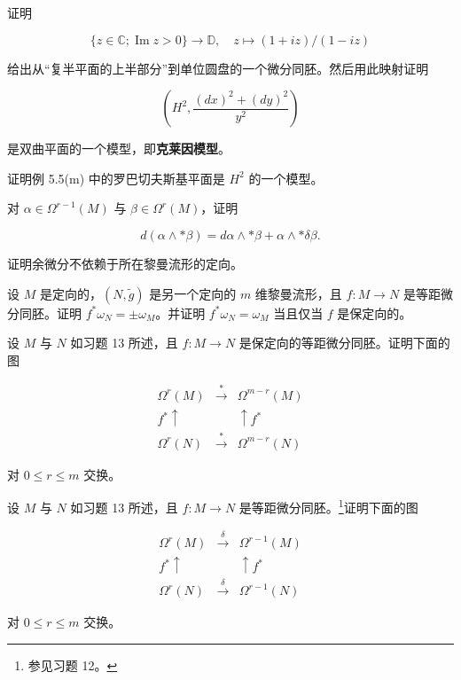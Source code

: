 \begin{exercises}
证明

\[
\{ z \in \mathbb{C} ; \operatorname{Im} z > 0 \} \to \mathbb{D} , \quad z \mapsto (1 + iz)/(1 - iz)
\]

给出从“复半平面的上半部分”到单位圆盘的一个微分同胚。然后用此映射证明

\[
\left( H^{2}, \frac{(dx)^{2} + (dy)^{2}}{y^{2}} \right)
\]

是双曲平面的一个模型，即\textbf{克莱因模型}。

\item

证明例 5.5(m) 中的罗巴切夫斯基平面是 $ H^{2} $ 的一个模型。

\item

对 $ \alpha \in \Omega^{r-1}(M) $ 与 $ \beta \in \Omega^{r}(M) $，证明

\[
d(\alpha \wedge \ast\beta) = d\alpha \wedge \ast\beta + \alpha \wedge \ast\delta\beta .
\]
\item

证明余微分不依赖于所在黎曼流形的定向。

\item

设 $ M $ 是定向的，$ (N, \widetilde{g}) $ 是另一个定向的 $ m $ 维黎曼流形，且 $ f : M \to N $ 是等距微分同胚。证明 $ f^{\ast}\omega_{N} = \pm\omega_{M} $。并证明 $ f^{\ast}\omega_{N} = \omega_{M} $ 当且仅当 $ f $ 是保定向的。

\item

设 $ M $ 与 $ N $ 如习题 13 所述，且 $ f : M \to N $ 是保定向的等距微分同胚。证明下面的图

\begin{equation*}
\begin{array}{ccc} \Omega^{r}(M) & \xrightarrow{\ast} & \Omega^{m-r}(M) \\ f^{\ast}\uparrow & & \uparrow f^{\ast} \\ \Omega^{r}(N) & \xrightarrow{\ast} & \Omega^{m-r}(N) \end{array}
\end{equation*}

对 $ 0 \le r \le m $ 交换。

\item

设 $ M $ 与 $ N $ 如习题 13 所述，且 $ f : M \to N $ 是等距微分同胚。\footnote{参见习题 12。}证明下面的图

\begin{equation*}
\begin{array}{ccc} \Omega^{r}(M) & \xrightarrow{\delta} & \Omega^{r-1}(M) \\ f^{\ast}\uparrow & & \uparrow f^{\ast} \\ \Omega^{r}(N) & \xrightarrow{\delta} & \Omega^{r-1}(N) \end{array}
\end{equation*}

对 $ 0 \le r \le m $ 交换。

\end{exercises}

